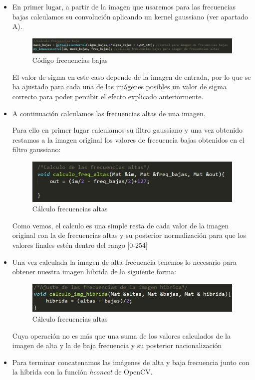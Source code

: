\begin{itemize}
	\item {En primer lugar, a partir de la imagen que usaremos para las frecuencias bajas calculamos su convolución aplicando un kernel gaussiano (ver apartado A).}
	
	\begin{figure}[H]
		\centering
		\includegraphics[width=0.6\linewidth]{freq_bajasB}
		\caption{Código frecuencias bajas }
		\label{fig:freq_bajasB}
	\end{figure}
	
	El valor de sigma en este caso depende de la imagen de entrada, por lo que se ha ajustado para cada una de las imágenes posibles un valor de sigma correcto para poder percibir el efecto explicado anteriormente.
	
	\item A continuación calculamos las frecuencias altas de una imagen.
	
	Para ello en primer lugar calculamos su filtro gaussiano y una vez obtenido restamos a la imagen original los valores de frecuencia bajas obtenidos en el filtro gaussiano:
	
		\begin{figure}[H]
			\centering
			\includegraphics[width=0.6\linewidth]{freq_altasB}
			\caption{Cálculo frecuencias altas }
			\label{fig:freq_altasB}
		\end{figure}
		
		Como vemos, el calculo es una simple resta de cada valor de la imagen original con la de frecuencias altas y su posterior normalización para que los valores finales estén dentro del rango [0-254]
		
	\item Una vez calculada la imagen de alta frecuencia tenemos lo necesario para obtener nuestra imagen hibrida de la siguiente forma:
	
	\begin{figure}[H]
		\centering
		\includegraphics[width=0.6\linewidth]{calculo_hibrida}
		\caption{Cálculo frecuencias altas }
		\label{fig:freq_altasB}
	\end{figure}
	
	Cuya operación no es más que una suma de los valores calculados de la imagen de alta y la de baja frecuencia y su posterior nacionalización
	
	\item Para terminar concatenamos las imágenes de alta y baja frecuencia junto con la híbrida con la función \textit{hconcat} de OpenCV.
\end{itemize}

